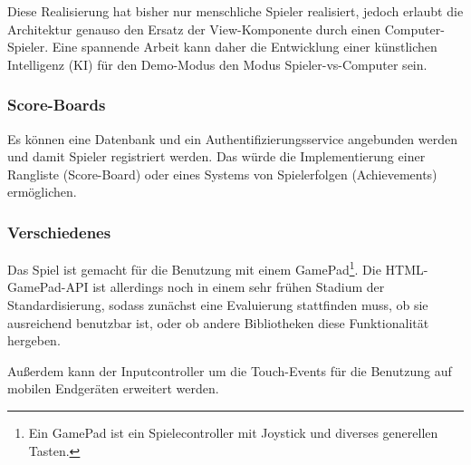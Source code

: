 Diese Realisierung hat bisher nur menschliche Spieler realisiert, jedoch erlaubt die Architektur genauso den Ersatz der View-Komponente durch einen Computer-Spieler. Eine spannende Arbeit kann daher die Entwicklung einer künstlichen Intelligenz (KI) für den Demo-Modus \bzw den Modus Spieler-vs-Computer sein.

\subsubsection{Score-Boards}

Es können eine Datenbank und ein Authentifizierungsservice angebunden werden und damit Spieler registriert werden. Das würde die Implementierung einer Rangliste (Score-Board) oder eines Systems von Spielerfolgen (Achievements) ermöglichen.

\subsubsection{Verschiedenes}

Das Spiel ist gemacht für die Benutzung mit einem GamePad\footnote{Ein GamePad ist ein Spielecontroller mit Joystick und diverses generellen Tasten.}. Die HTML-GamePad-API ist allerdings noch in einem sehr frühen Stadium der Standardisierung, sodass zunächst eine Evaluierung stattfinden muss, ob sie ausreichend benutzbar ist, oder ob andere Bibliotheken diese Funktionalität hergeben.

Außerdem kann der Inputcontroller um die Touch-Events für die Benutzung auf mobilen Endgeräten erweitert werden.